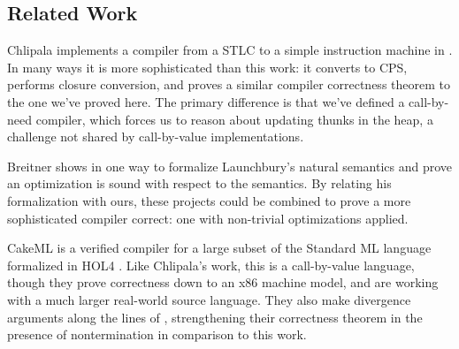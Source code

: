 \subsection{Related Work}

Chlipala implements a compiler from a STLC to a simple instruction machine in
\cite{chlipala2007certified}. In many ways it is more sophisticated than this
work: it converts to CPS, performs closure conversion, and proves a similar
compiler correctness theorem to the one we've proved here. The primary
difference is that we've defined a call-by-need compiler, which forces us to
reason about updating thunks in the heap, a challenge not shared by
call-by-value implementations.

Breitner shows in \cite{breitnerthesis} one way to formalize Launchbury's
natural semantics \cite{launchburynatural} and prove an optimization is sound
with respect to the semantics. By relating his formalization with ours, these
projects could be combined to prove a more sophisticated compiler correct: one
with non-trivial optimizations applied.

CakeML \cite{cakeml14} is a verified compiler for a large subset of the Standard
ML language formalized in HOL4 \cite{slind2008brief}. Like Chlipala's work, this
is a call-by-value language, though they prove correctness down to an x86
machine model, and are working with a much larger real-world source language.
They also make divergence arguments along the lines of \cite{functionalbigstep},
strengthening their correctness theorem in the presence of nontermination in
comparison to this work.




